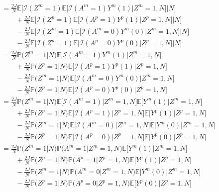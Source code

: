 \documentclass[12pt]{extarticle}
\newcommand{\pp}{\mathbb{P}}
\newcommand{\E}{\mathbb{E}}
\newcommand{\nind}{J}
\newcommand{\indicator}{\mathcal{I}}
\begin{document}
{\begin{align}
\ & = \frac{2\nind}{N} \E\Big[\indicator(Z^m=1)\E\big[\indicator(A^m=1)Y^m(1)\big|Z^m=1, N\big]\Big|N \Big] \nonumber \\
\ & \qquad + \frac{2\nind}{N} \E\Big[\indicator(Z^p=1)\E\big[\indicator(A^p=1)Y^p(1)\big|Z^p=1, N\big]\Big|N \Big] \nonumber \\
\ & \qquad - \frac{2\nind}{N} \E\Big[\indicator(Z^m=1)\E\big[\indicator(A^m=0)Y^m(0)\big|Z^m=1, N\big]\Big|N \Big] \nonumber \\
\ & \qquad - \frac{2\nind}{N} \E\Big[\indicator(Z^p=1)\E\big[\indicator(A^p=0)Y^p(0)\big|Z^p=1, N\big]\Big|N \Big] \tag{A3.a} \label{eq:a1} \\
\ & = \frac{2\nind}{N} \pp\big(Z^m=1\big|N\big) \E\big[\indicator(A^m=1)Y^m(1)\big|Z^m=1, N\big] \nonumber \\
\ & \qquad + \frac{2\nind}{N} \pp\big(Z^p=1\big|N\big) \E\big[\indicator(A^p=1)Y^p(1)\big|Z^p=1,N\big] \nonumber \\
\ & \qquad - \frac{2\nind}{N} \pp\big(Z^m=1\big|N\big) \E\big[\indicator(A^m=0)Y^m(0)\big|Z^m=1,N\big] \nonumber \\
\ & \qquad - \frac{2\nind}{N} \pp\big(Z^p=1\big|N\big) \E\big[\indicator(A^p=0)Y^p(0)\big|Z^p=1,N\big] \tag{A3.b} \label{eq:a2} \\
\ & = \frac{2\nind}{N} \pp\big(Z^m=1\big|N\big) \E\big[\indicator(A^m=1)\big|Z^m=1,N\big] \E\big[Y^m(1)\big|Z^m=1, N\big] \nonumber \\
\ & \qquad + \frac{2\nind}{N} \pp\big(Z^p=1\big|N\big) \E\big[\indicator(A^p=1)\big|Z^p=1,N\big]\E\big[Y^p(1)\big|Z^p=1,N\big] \nonumber \\
\ & \qquad - \frac{2\nind}{N} \pp\big(Z^m=1\big|N\big) \E\big[\indicator(A^m=0)\big|Z^m=1,N\big]\E\big[Y^m(0)\big|Z^m=1,N\big] \nonumber \\
\ & \qquad - \frac{2\nind}{N} \pp\big(Z^p=1\big|N\big) \E\big[\indicator(A^p=0)\big|Z^p=1,N\big]\E\big[Y^p(0)\big|Z^p=1,N\big] \tag{A3.c} \label{eq:a3} \\
\ & = \frac{2\nind}{N} \pp\big(Z^m=1\big|N\big) \pp\big(A^m=1\big|Z^m=1,N\big) \E\big[Y^m(1)\big|Z^m=1, N\big] \nonumber \\
\ & \qquad + \frac{2\nind}{N} \pp\big(Z^p=1\big|N\big) \pp\big(A^p=1\big|Z^p=1,N\big)\E\big[Y^p(1)\big|Z^p=1,N\big] \nonumber \\
\ & \qquad - \frac{2\nind}{N} \pp\big(Z^m=1\big|N\big) \pp\big(A^m=0\big|Z^m=1,N\big)\E\big[Y^m(0)\big|Z^m=1,N\big] \nonumber \\
\ & \qquad - \frac{2\nind}{N} \pp\big(Z^p=1\big|N\big) \pp\big(A^p=0\big|Z^p=1,N\big)\E\big[Y^p(0)\big|Z^p=1,N\big] \tag{A3.d} \label{eq:a4} \\

\end{align}}
\end{document}
